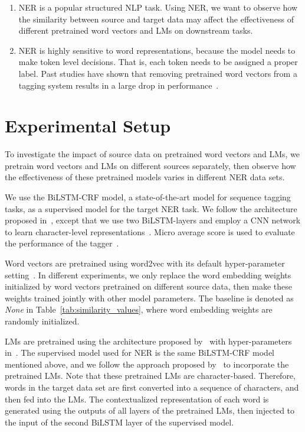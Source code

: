 \documentclass[11pt,a4paper]{article}
\begin{document}
\begin{enumerate}
\item NER is a popular structured NLP task. 
Using NER, we want to observe how the similarity between source and target data may affect the effectiveness of different pretrained word vectors and LMs on downstream tasks.
\item NER is highly sensitive to word representations, because the model needs to make token level decisions. 
That is, each token needs to be assigned a proper label. 
Past studies have shown that removing pretrained word vectors from a tagging system results in a large drop in performance~\cite{Huang:Xu:arXiv:2015,Lample:Ballesteros:NAACL:2016}.
\end{enumerate}

\section{Experimental Setup}
\label{section:experimental-setup}
To investigate the impact of source data on pretrained word vectors and LMs, we pretrain word vectors and LMs on different sources separately, then observe how the effectiveness of these pretrained models varies in different NER data sets.

We use the BiLSTM-CRF model, a state-of-the-art model for sequence tagging tasks, as a supervised model for the target NER task. 
We follow the architecture proposed in~\citep{Lample:Ballesteros:NAACL:2016}, except that we use two BiLSTM-layers and employ a CNN network to learn character-level representations~\citep{Ma:Hovy:ACL:2016}. 
Micro average  score is used to evaluate the performance of the tagger~\citep{Sang:Meulder:CONLL:2003}.

Word vectors are pretrained using word2vec with its default hyper-parameter setting~\citep{Mikolov:Chen:arXiv:2013}. 
In different experiments, we only replace the word embedding weights initialized by word vectors pretrained on different source data, then make these weights trained jointly with other model parameters. 
The baseline is denoted as {\em None} in Table~\ref{tab:similarity_values}, where word embedding weights are randomly initialized. 

LMs are pretrained using the architecture proposed by~\citet{Jozefowicz:Vinyals:arXiv:2016} with hyper-parameters in~\citep{Peters:Neumann:NAACL:2018}. 
The supervised model used for NER is the same BiLSTM-CRF model mentioned above, and we follow the approach proposed by~\citet{Peters:Neumann:NAACL:2018} to incorporate the pretrained LMs.
Note that these pretrained LMs are character-based. 
Therefore, words in the target data set are first converted into a sequence of characters, and then fed into the LMs. 
The contextualized representation of each word is generated using the outputs of all layers of the pretrained LMs, then injected to the input of the second BiLSTM layer of the supervised model.
\end{document}

